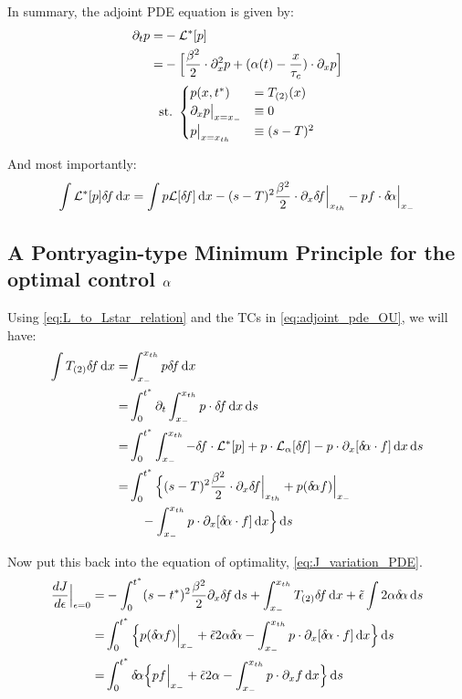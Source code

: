 \documentclass{article}
\begin{document}
In summary, the adjoint PDE equation is given by: 
\begin{equation}
\begin{gathered}
\begin{aligned}
{\partial}_t p =& - { { \mathcal{L} }^* }[p]
\\
		=&  
			- \Big[ \frac{{\beta}^2 }{2}\cdot {\partial}^2_x p +  
			({\alpha}(t)- \frac{x}{{ \tau_{c} }})  \cdot {\partial}_x p \Big] 
\end{aligned}
\\
{ \textrm{st.\ } }  
\begin{cases}
	p(x,{ t^* }) &= { {T}_{(2)} }(x)
	\\ 
	{\partial}_x p  \big|_{x={ x_{-} }} &\equiv 0
	\\
	p \big|_{x={ x_{th} }} &\equiv (s-T)^2
\end{cases}
\label{eq:adjoint_pde_OU}
\end{gathered}
\end{equation} 

And most importantly:
\begin{equation}
\int { { \mathcal{L} }^* } [p] { \delta\! f} \, \mathrm{d} x
=  
\int p { \mathcal{L} } [{ \delta\! f}] \, \mathrm{d} x 
  - (s-T)^2 \frac{{\beta}^2 }{2}\cdot {\partial}_x { \delta\! f}\Big|_{ x_{th} } 
  -  p  f \cdot { \delta\! {\alpha}} \Big|_{ x_{-} }
\label{eq:L_to_Lstar_relation}
\end{equation}

\subsection{A Pontryagin-type Minimum Principle for the optimal control ${\alpha}$}
Using \cref{eq:L_to_Lstar_relation} and the TCs in \cref{eq:adjoint_pde_OU}, we
will have:
\begin{align*}
\int \Ttwo \df \intd{x} =& 
\int_\xmin^\xth p \df \intd{x}
\\ =& \int_0^\T \di_t \int_\xmin^\xth p \cdot \df \intd{x} \intd{s}
\\
=& \int_0^\T \int _\xmin^\xth - \df \cdot \Lstar[p]
 + p \cdot \L_\a [\df] 
 -  p \cdot \di_x [\da \cdot f]  \intd{x}  \intd{s}
\\
=& 
\int_0^\T \Big\{  (s-T)^2 \frac{\b^2 }{2}\cdot \di_x \df\Big|_\xth 
+  p (\da f)\Big|_\xmin
\\
& \quad
- \int _\xmin^\xth p \cdot \di_x [\da \cdot f] \intd{x} \Big\} \intd{s}
\end{align*}

Now put this back into the equation of optimality, \cref{eq:J_variation_PDE}.
\begin{align*}
\frac {dJ}{d{\epsilon}} \Big|_{{\epsilon} = 0} =&
- \int_0^{ t^* } (s-{ t^* })^2 \frac {{\beta}^2}{2} {\partial}_x  { \delta\! f} \, \mathrm{d} s  
+ \int_{ x_{-} }^{ x_{th} } { {T}_{(2)} }{ \delta\! f}\, \mathrm{d} x
+ \tilde{{\epsilon}} \int 2 {\alpha} { \delta\! {\alpha}} \, \mathrm{d} s
\\
=& 
\int_0^{ t^* } \Big\{
 p ({ \delta\! {\alpha}} f)\Big|_{ x_{-} }
+ \tilde{{\epsilon}}  2 {\alpha} { \delta\! {\alpha}}
- \int _{ x_{-} }^{ x_{th} } p \cdot {\partial}_x [{ \delta\! {\alpha}} \cdot f] \, \mathrm{d} x 
 \Big\} \, \mathrm{d} s
 \\
=& 
\int_0^{ t^* } { \delta\! {\alpha}} \Big\{
 p f \Big|_{ x_{-} }
+ \tilde{{\epsilon}}  2 {\alpha}
- \int _{ x_{-} }^{ x_{th} } p \cdot {\partial}_x f \, \mathrm{d} x 
 \Big\} \, \mathrm{d} s
\end{align*}
\end{document}
